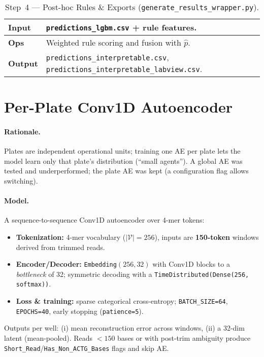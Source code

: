 \begin{table}[H]\centering
\caption{Step~4 — Post-hoc Rules \& Exports (\texttt{generate\_results\_wrapper.py}).}
\begin{tabular}{|p{3.8cm}|p{9.8cm}|}\hline
\textbf{Input} & \texttt{predictions\_lgbm.csv} + rule features. \\ \hline
\textbf{Ops} & Weighted rule scoring and fusion with $\hat p$. \\ \hline
\textbf{Output} & \texttt{predictions\_interpretable.csv}, \texttt{predictions\_interpretable\_labview.csv}. \\ \hline
\end{tabular}
\end{table}

\section{Per-Plate Conv1D Autoencoder}
\label{sec:ae}

\paragraph{Rationale.} Plates are independent operational units; training one AE per plate lets the model learn only that plate’s distribution (``small agents''). A global AE was tested and underperformed; the plate AE was kept (a configuration flag allows switching).

\paragraph{Model.} A sequence-to-sequence Conv1D autoencoder over 4-mer tokens:
\begin{itemize}
  \item \textbf{Tokenization:} 4-mer vocabulary ($|\mathcal{V}|=256$), inputs are \textbf{150-token} windows derived from trimmed reads.
  \item \textbf{Encoder/Decoder:} \texttt{Embedding}$(256,32)$ with Conv1D blocks to a \emph{bottleneck} of 32; symmetric decoding with a \texttt{TimeDistributed(Dense(256, softmax))}.
  \item \textbf{Loss \& training:} sparse categorical cross-entropy; \texttt{BATCH\_SIZE=64}, \texttt{EPOCHS=40}, early stopping (\texttt{patience=5}).
\end{itemize}

Outputs per well: (i) mean reconstruction error across windows, (ii) a 32-dim latent (mean-pooled). Reads $<150$ bases or with post-trim ambiguity produce \texttt{Short\_Read}/\texttt{Has\_Non\_ACTG\_Bases} flags and skip AE.

